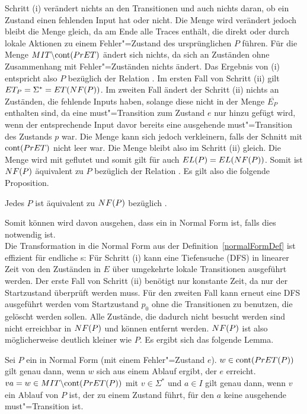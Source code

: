Schritt (i) verändert nichts an den Transitionen und auch nichts daran, ob ein
Zustand einen fehlenden Input hat oder nicht. Die Menge \StET{} wird verändert
jedoch bleibt die Menge \PrET{} gleich, da \StET{} am Ende alle Traces enthält,
die direkt oder durch lokale Aktionen zu einem Fehler"=Zustand des
ursprünglichen $P$ führen. Für die Menge $MIT\backslash\mathrm{cont} (PrET)$ ändert
sich nichts, da sich an Zuständen ohne Zusammenhang mit Fehler"=Zuständen
nichts ändert. Das Ergebnis von (i) entspricht also $P$ bezüglich der Relation
\ERel{}. Im ersten Fall von Schritt (ii) gilt $ET _P =\Sigma ^* = ET (NF
(P))$. Im zweiten Fall ändert der Schritt (ii) nichts an Zuständen, die
fehlende Inputs haben, solange diese nicht in der Menge $\overline{E_P}$
enthalten sind, da eine must"=Transition zum Zustand $e$ nur hinzu gefügt
wird, wenn der entsprechende Input davor bereits eine ausgehende
must"=Transition des Zustands $p$ war. Die Menge \MIT{} kann sich jedoch
verkleinern, falls der Schnitt mit $\mathrm{cont} (PrET)$ nicht leer war. Die Menge
\ET{} bleibt also im Schritt (ii) gleich. Die Menge \EL{} wird mit \ET{}
geflutet und somit gilt für \EL{} auch $EL (P) = EL (NF (P))$. Somit ist
$NF (P)$ äquivalent zu $P$ bezüglich der Relation \ERel{}. Es gilt also die
folgende Proposition.

\begin{Prop}
  \label{normalFormProp}
  Jedes \MEIO{} $P$ ist äquivalent zu $NF (P)$ bezüglich \ERel{}.
\end{Prop}

Somit können wird davon ausgehen, dass ein \MEIO{} in Normal Form ist, falls
dies notwendig ist.\\
Die Transformation in die Normal Form aus der Definition~\ref{normalFormDef}
ist effizient für endliche \MEIO{}s: Für Schritt (i)  kann eine Tiefensuche
(DFS) in linearer Zeit von den Zuständen in $E$ über umgekehrte lokale
Transitionen ausgeführt werden. Der erste Fall von Schritt (ii) benötigt nur
konstante Zeit, da nur der Startzustand überprüft werden muss. Für den zweiten
Fall kann erneut eine DFS ausgeführt werden vom Startzustand $p_0$ ohne die
Transitionen zu benutzen, die gelöscht werden sollen. Alle Zustände, die
dadurch nicht besucht werden sind nicht erreichbar in $NF (P)$ und können
entfernt werden. $NF (P)$ ist also möglicherweise deutlich kleiner wie $P$. Es
ergibt sich das folgende Lemma.

\begin{Lem}
  \label{AblaufNFLem}
  Sei $P$ ein \MEIO{} in Normal Form (mit einem Fehler"=Zustand $e$). $w\in
  \mathrm{cont} (PrET (P)) $ gilt genau dann, wenn $w$ sich aus einem Ablauf ergibt,
  der $e$ erreicht. $va = w\in MIT \backslash \mathrm{cont}(PrET (P))$ mit $v\in
  \Sigma ^*$ und $a\in I$ gilt genau dann, wenn $v$ ein Ablauf von $P$ ist, der
  zu einem Zustand führt, für den $a$ keine ausgehende must"=Transition ist.
\end{Lem}

